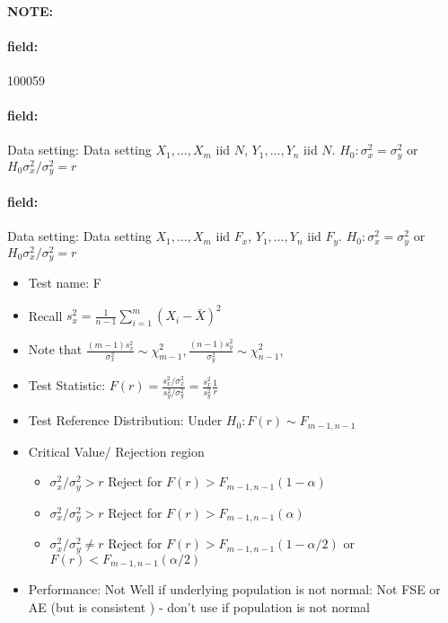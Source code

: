 \documentclass[12pt]{article}
\newenvironment{note}{\paragraph{NOTE:}}{}
\newenvironment{field}{\paragraph{field:}}{}
\begin{document}
\begin{note} \begin{field} \tiny 100059 \end{field}
 \begin{field}
  Data setting: Data setting $X_1, \ldots , X_m$ iid $N$, $Y_1, \ldots, Y_n$ iid $N$. $H_0: \sigma_x^2 = \sigma_y^2$ or $H_0 \sigma_x^2/\sigma_y^2 = r$
 \end{field}
 \begin{field}
  Data setting: Data setting $X_1, \ldots , X_m$ iid $F_x$, $Y_1, \ldots, Y_n$ iid $F_y$. $H_0: \sigma_x^2 = \sigma_y^2$ or $H_0 \sigma_x^2/\sigma_y^2 = r$
  \begin{itemize}
   \item Test name: F
   \item Recall $s_x^2 = \frac{1}{n-1}\sum_{i=1}^m(X_i - \bar{X})^2$
   \item Note that $\frac{(m-1)s_x^2}{\sigma_x^2} \sim \chi^2_{m-1}, \frac{(n-1)s_y^2}{\sigma_y^2} \sim \chi^2_{n-1},$
   \item Test Statistic: $F(r) = \frac{s_x^2/\sigma_x^2}{s_y^2/\sigma_y^2} = \frac{s_x^2}{s_y^2} \frac{1}{r}$
   \item Test Reference Distribution: Under $H_0: F(r) \sim F_{m-1,n-1}$
   \item Critical Value/ Rejection region
         \begin{itemize}
          \item $\sigma_x^2/\sigma_y^2 > r$ Reject for $F(r) > F_{m-1,n-1}(1-\alpha)$
          \item $\sigma_x^2/\sigma_y^2 > r$ Reject for $F(r) > F_{m-1,n-1}(\alpha)$
          \item $\sigma_x^2/\sigma_y^2 \neq r$ Reject for $F(r) > F_{m-1,n-1}(1-\alpha/2)$ or $F(r) < F_{m-1,n-1}(\alpha/2)$
         \end{itemize}
   \item Performance: Not Well if underlying population is not normal: Not FSE or AE (but is consistent ) - don't use if population is not normal
  \end{itemize}
 \end{field}
\end{note}
\end{document}
